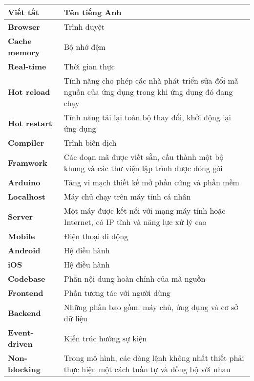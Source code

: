 \documentclass[../DoAn.tex]{subfiles}
\begin{document}
\begin{longtable}{l p{12cm}}
	\hline
   \textbf{Viết tắt}  & \textbf{Tên tiếng Anh} \\ \hline 
	\textbf{Browser} & Trình duyệt \\
	\textbf{Cache memory} & Bộ nhớ đệm \\
	\textbf{Real-time} & Thời gian thực \\
	\textbf{Hot reload} & Tính năng cho phép các nhà phát triển sửa đổi mã nguồn của ứng dụng trong khi ứng dụng đó đang chạy \\
    \textbf{Hot restart} &  Tính năng tải lại toàn bộ thay đổi, khởi động lại ứng dụng \\
    \textbf{Compiler}  &  Trình biên dịch \\
    \textbf{Framwork}   &   Các đoạn mã được viết sẵn, cấu thành một bộ khung và các thư viện lập trình được đóng gói \\
    \textbf{Arduino}  &  Tảng vi mạch thiết kế mở phần cứng và phần mềm \\
    \textbf{Localhost}  &  Máy chủ chạy trên máy tính cá nhân \\
    \textbf{Server}  &  Một máy được kết nối với mạng máy tính hoặc Internet, có IP tĩnh và năng lực xử lý cao \\
    \textbf{Mobile}  &  Điện thoại di động \\
    \textbf{Android}  &  Hệ điều hành \\
    \textbf{iOS}  &  Hệ điều hành \\
    \textbf{Codebase}  &  Phần nội dung hoàn chỉnh của mã nguồn \\
     \textbf{Frontend}  &  Phần tương tác với người dùng \\
    \textbf{Backend}  &  Những phần bao gồm: máy chủ, ứng dụng và cơ sở dữ liệu \\
    \textbf{Event-driven}  &  Kiến trúc hướng sự kiện \\
    \textbf{Non-blocking}  &  Trong mô hình, các dòng lệnh không nhất thiết phải thực hiện một cách tuần tự và đồng bộ với nhau \\
    \hline
\end{longtable}
\end{document}
